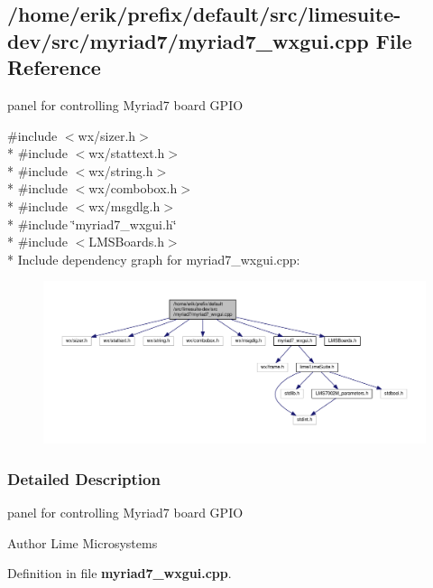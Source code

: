 \subsection{/home/erik/prefix/default/src/limesuite-\/dev/src/myriad7/myriad7\+\_\+wxgui.cpp File Reference}
\label{myriad7__wxgui_8cpp}


panel for controlling Myriad7 board G\+P\+IO  


{\ttfamily \#include $<$wx/sizer.\+h$>$}\\*
{\ttfamily \#include $<$wx/stattext.\+h$>$}\\*
{\ttfamily \#include $<$wx/string.\+h$>$}\\*
{\ttfamily \#include $<$wx/combobox.\+h$>$}\\*
{\ttfamily \#include $<$wx/msgdlg.\+h$>$}\\*
{\ttfamily \#include \char`\"{}myriad7\+\_\+wxgui.\+h\char`\"{}}\\*
{\ttfamily \#include $<$L\+M\+S\+Boards.\+h$>$}\\*
Include dependency graph for myriad7\+\_\+wxgui.\+cpp\+:
\nopagebreak
\begin{figure}[H]
\begin{center}
\leavevmode
\includegraphics[width=350pt]{d1/dcf/myriad7__wxgui_8cpp__incl}
\end{center}
\end{figure}


\subsubsection{Detailed Description}
panel for controlling Myriad7 board G\+P\+IO 

\begin{DoxyAuthor}{Author}
Lime Microsystems 
\end{DoxyAuthor}


Definition in file {\bf myriad7\+\_\+wxgui.\+cpp}.

